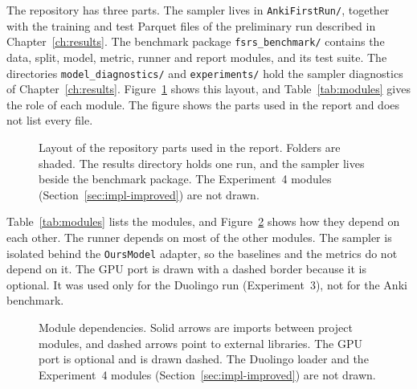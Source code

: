 The repository has three parts. The sampler lives in \texttt{AnkiFirstRun/}, together with the
training and test Parquet files of the preliminary run described in Chapter~\ref{ch:results}. The
benchmark package \texttt{fsrs\_benchmark/\allowbreak } contains the data, split, model, metric, runner and
report modules, and its test suite. The directories \texttt{model\_diagnostics/} and
\texttt{experiments/} hold the sampler diagnostics of Chapter~\ref{ch:results}. Figure~\ref{fig:tk_dir_tree}
shows this layout, and Table~\ref{tab:modules} gives the role of each module. The figure shows the parts
used in the report and does not list every file.

\begin{figure}[htbp]
  \centering
  
  \caption{Layout of the repository parts used in the report. Folders are shaded. The results
    directory holds one run, and the sampler lives beside the benchmark package. The Experiment~4 modules (Section~\ref{sec:impl-improved}) are not drawn.}
  \label{fig:tk_dir_tree}
\end{figure}

Table~\ref{tab:modules} lists the modules, and Figure~\ref{fig:tk_module_deps} shows how they depend on
each other. The runner depends on most of the other modules. The
sampler is isolated behind the \texttt{OursModel} adapter, so the baselines and the metrics do not
depend on it. The GPU port is drawn with a dashed border because it is optional. It was used only for the Duolingo run (Experiment~3), not for the Anki benchmark.

\begin{figure}[htbp]
  \centering
  
  \caption{Module dependencies. Solid arrows are imports between project modules, and dashed arrows
    point to external libraries. The GPU port is optional and is drawn dashed. The Duolingo loader and the Experiment~4 modules (Section~\ref{sec:impl-improved}) are not drawn.}
  \label{fig:tk_module_deps}
\end{figure}


